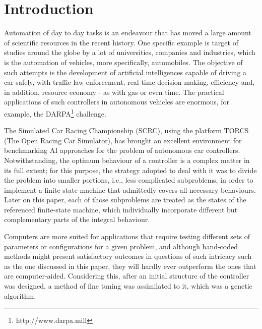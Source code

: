 \section{\textbf{Introduction}}
	
	Automation of day to day tasks is an endeavour that has moved a large amount of scientific resources in the
	recent history. One specific example is target of studies around the globe by a lot of universities, companies
	and industries, which is the automation of vehicles, more specifically, automobiles. The objective of such
	attempts is the development of artificial intelligences capable of driving a car safely, with traffic law
	enforcement, real-time decision making, efficiency and, in addition, resource economy - as with gas or even
	time. The practical applications of such controllers in autonomous vehicles are enormous, for example, the 
	DARPA\footnote{http://www.darpa.mill} challenge. 

	The Simulated Car Racing Championship (SCRC), using the platform TORCS (The Open Racing Car Simulator), has
	brought an excellent environment for benchmarking AI approaches for the problem of autonomous car controllers.
	Notwithstanding, the optimum behaviour of a controller is a complex matter in its full extent; for this purpose,
	the strategy adopted to deal with it was to divide the problem into smaller portions, i.e., less complicated
	subproblems, in order to implement a finite-state machine that admittedly covers all necessary behaviours. Later
	on this paper, each of those subproblems are treated as the states of the referenced finite-state machine, which
	individually incorporate different but complementary parts of the integral behaviour.
	
	Computers are more suited for applications that require testing different sets of parameters or configurations for
	a given problem, and although hand-coded methods might present satisfactory outcomes in questions of such
	intricacy such as the one discussed in this paper, they will hardly ever outperform the ones that are
	computer-aided. Considering this, after an initial structure of the controller was designed, a method of fine
	tuning was assimilated to it, which was a genetic algorithm.
	
